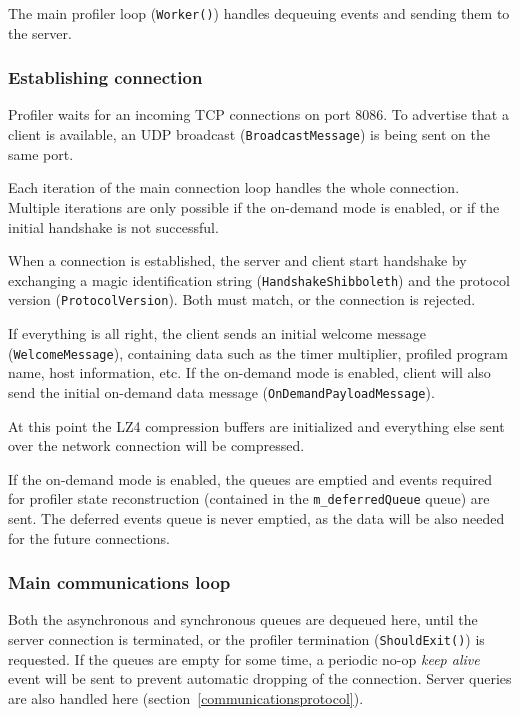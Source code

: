 \documentclass[hidelinks,titlepage,a4paper]{article}
\begin{document}
The main profiler loop (\texttt{Worker()}) handles dequeuing events and sending them to the server.

\subsubsection{Establishing connection}

Profiler waits for an incoming TCP connections on port 8086. To advertise that a client is available, an UDP broadcast (\texttt{BroadcastMessage}) is being sent on the same port.

Each iteration of the main connection loop handles the whole connection. Multiple iterations are only possible if the on-demand mode is enabled, or if the initial handshake is not successful.

When a connection is established, the server and client start handshake by exchanging a magic identification string (\texttt{HandshakeShibboleth}) and the protocol version (\texttt{ProtocolVersion}). Both must match, or the connection is rejected.

If everything is all right, the client sends an initial welcome message (\texttt{WelcomeMessage}), containing data such as the timer multiplier, profiled program name, host information, etc. If the on-demand mode is enabled, client will also send the initial on-demand data message (\texttt{OnDemandPayloadMessage}).

At this point the LZ4 compression buffers are initialized and everything else sent over the network connection will be compressed.

If the on-demand mode is enabled, the queues are emptied and events required for profiler state reconstruction (contained in the \texttt{m\_deferredQueue} queue) are sent. The deferred events queue is never emptied, as the data will be also needed for the future connections.

\subsubsection{Main communications loop}

Both the asynchronous and synchronous queues are dequeued here, until the server connection is terminated, or the profiler termination (\texttt{ShouldExit()}) is requested. If the queues are empty for some time, a periodic no-op \emph{keep alive} event will be sent to prevent automatic dropping of the connection. Server queries are also handled here (section~\ref{communicationsprotocol}).
\end{document}

